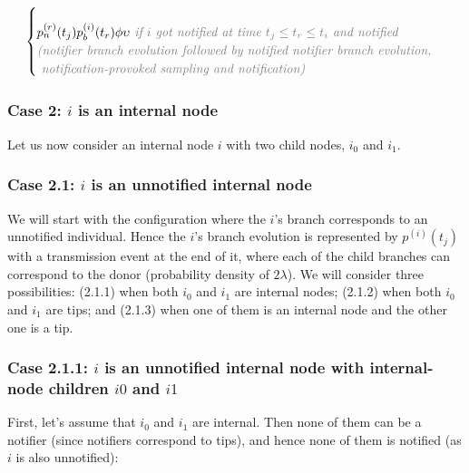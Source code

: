 \documentclass[10pt,letterpaper]{article}
\begin{document}
\begin{equation}
\begin{array}{ll}
\begin{cases}
\\
p_n^{(r)}(t_j) p_b^{(i)}(t_r) \phi \upsilon \textit{\color{gray} ~if $i$ got notified at time $t_j \leq t_r \leq t_i$ and notified}\\
\textit{\color{gray} (notifier branch evolution followed by notified notifier branch evolution,} \\
\textit{\color{gray}~notification-provoked sampling and notification)}\\
\end{cases}\\
\end{array}
\label{eq:tip}
\end{equation}

\subsubsection*{Case 2: $i$ is an internal node} 
Let us now consider an internal node $i$ with two child nodes, $i_0$ and $i_1$. 

\subsubsection*{Case 2.1: $i$ is an unnotified internal node} 
We will start with the configuration where the $i$'s branch corresponds to an unnotified individual. Hence the $i$'s branch evolution is represented by $p^{(i)}(t_j)$ with a transmission event at the end of it, where each of the child branches can correspond to the donor (probability density of $2\lambda$). We will consider three possibilities: (2.1.1) when both $i_0$ and $i_1$ are internal nodes; (2.1.2) when both $i_0$ and $i_1$ are tips; and (2.1.3) when one of them is an internal node and the other one is a tip.


\subsubsection*{Case 2.1.1: $i$ is an unnotified internal node with internal-node children $i0$ and $i1$}

First, let's assume that $i_0$ and $i_1$ are internal. Then none of them can be a notifier (since notifiers correspond to tips), and hence none of them is notified (as $i$ is also unnotified):
\end{document}

